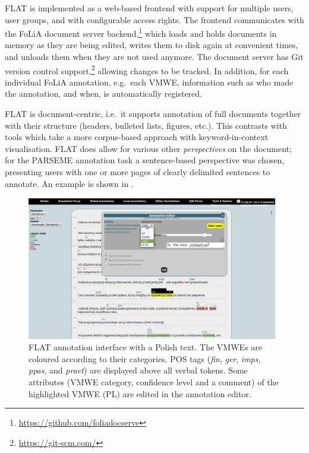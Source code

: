 \documentclass[output=paper,modfonts]{langscibook}
\begin{document}
FLAT is implemented as a web-based frontend with support for multiple users, user groups, and with configurable access rights. The frontend communicates with the FoLiA document server
backend,\footnote{\scriptsize{\url{https://github.com/foliadocserve}}} which loads and holds documents in memory as they are being edited, writes them to disk again at convenient times, and unloads them when they are not used anymore. The document server has Git version control support,\footnote{\scriptsize{\url{https://git-scm.com/}}} allowing changes to be tracked. In addition, for each individual FoLiA annotation, %
e.g.\ each VMWE, %
information  such as who made the annotation, and when, is automatically registered.

FLAT is document-centric, i.e.\ it supports annotation of full documents together with their structure  (headers, bulleted lists, figures, etc.). 
This %
contrasts with tools which take a more corpus-based approach with keyword-in-context visualisation. FLAT does allow for various other \emph{perspectives} on 
the document; for the PARSEME annotation task a sentence-based perspective was chosen, presenting users with one or more pages of clearly delimited sentences to annotate. An example is shown in .

\begin{figure}
\includegraphics[width=0.98\textwidth]{figures/flat-pl.png}
\caption{FLAT annotation interface with a Polish text. The VMWEs are coloured according to their categories. POS tags (\textit{fin}, \textit{ger}, \textit{imps}, \textit{ppas}, and \textit{praet}) are displayed above all verbal tokens. Some attributes (VMWE category, confidence level and a comment) of the highlighted VMWE (PL)  are edited in the annotation editor.}
\label{fig:flat1}
\end{figure}
\end{document}
